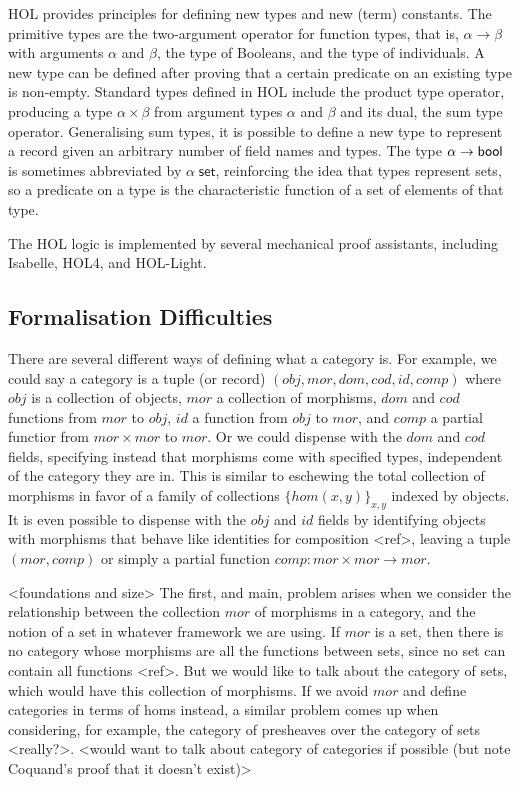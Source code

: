 \documentclass[twoside,titlepage,11pt]{article}
\begin{document}
HOL provides principles for defining new types and new (term) constants.
The primitive types are the two-argument operator for function types, that is, $\alpha\to\beta$ with arguments $\alpha$ and $\beta$, the type of Booleans, and the type of individuals.
A new type can be defined after proving that a certain predicate on an existing type is non-empty.
Standard types defined in HOL include the product type operator, producing a type $\alpha\times\beta$ from argument types $\alpha$ and $\beta$ and its dual, the sum type operator.
Generalising sum types, it is possible to define a new type to represent a record given an arbitrary number of field names and types.
The type $\alpha\to\mathsf{bool}$ is sometimes abbreviated by $\alpha\;\mathsf{set}$, reinforcing the idea that types represent sets, so a predicate on a type is the characteristic function of a set of elements of that type. 

The HOL logic is implemented by several mechanical proof assistants, including Isabelle, HOL4, and HOL-Light.
\subsection{Formalisation Difficulties}%
There are several different ways of defining what a category is.
For example, we could say a category is a tuple (or record) $(obj,mor,dom,cod,id,comp)$ where $obj$ is a collection of objects, $mor$ a collection of morphisms, $dom$ and $cod$ functions from $mor$ to $obj$, $id$ a function from $obj$ to $mor$, and $comp$ a partial functior from $mor\times mor$ to $mor$.
Or we could dispense with the $dom$ and $cod$ fields, specifying instead that morphisms come with specified types, independent of the category they are in.
This is similar to eschewing the total collection of morphisms in favor of a family of collections $\{hom(x,y)\}_{x,y}$ indexed by objects.
It is even possible to dispense with the $obj$ and $id$ fields by identifying objects with morphisms that behave like identities for composition <ref>, leaving a tuple $(mor,comp)$ or simply a partial function $comp:mor\times mor\to mor$.

<foundations and size>%
The first, and main, problem arises when we consider the relationship between the collection $mor$ of morphisms in a category, and the notion of a set in whatever framework we are using.
If $mor$ is a set, then there is no category whose morphisms are all the functions between sets, since no set can contain all functions <ref>.
But we would like to talk about the category of sets, which would have this collection of morphisms.
If we avoid $mor$ and define categories in terms of homs instead, a similar problem comes up when considering, for example, the category of presheaves over the category of sets <really?>.
<would want to talk about category of categories if possible (but note Coquand's proof that it doesn't exist)>
\end{document}
